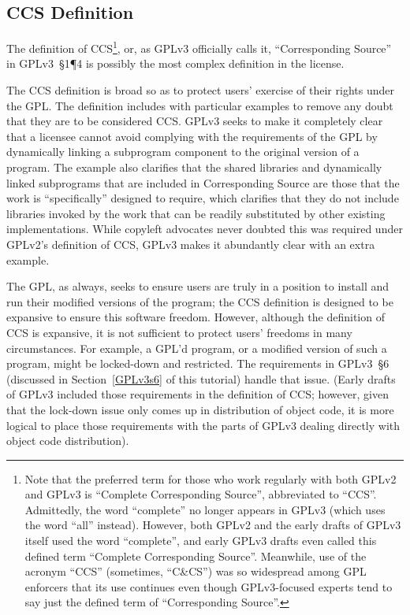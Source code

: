 \subsection{CCS Definition}
\label{CCS Definition}

The definition of CCS\footnote{Note that the preferred term for those who
  work regularly with both GPLv2 and GPLv3 is ``Complete Corresponding
  Source'', abbreviated to ``CCS''.  Admittedly, the word ``complete'' no
  longer appears in GPLv3 (which uses the word ``all'' instead).  However,
  both GPLv2 and the early drafts of GPLv3 itself used the word ``complete'',
  and early GPLv3 drafts even called this defined term ``Complete
  Corresponding Source''.  Meanwhile, use of the acronym ``CCS'' (sometimes,
  ``C\&CS'') was so widespread among GPL enforcers that its use continues
  even though GPLv3-focused experts tend to say just the defined term of
  ``Corresponding Source''.}, or, as GPLv3 officially calls it,
``Corresponding Source'' in GPLv3~\S1\P4 is possibly the most complex
definition in the license.

The CCS definition is broad so as to protect users' exercise of their rights
under the GPL\@.  The definition includes with particular examples to remove
any doubt that they are to be considered CCS\@.  GPLv3 seeks to make it
completely clear that a licensee cannot avoid complying with the requirements
of the GPL by dynamically linking a subprogram component to the original
version of a program.  The example also clarifies that the shared libraries
and dynamically linked subprograms that are included in Corresponding Source
are those that the work is ``specifically'' designed to require, which
clarifies that they do not include libraries invoked by the work that can be
readily substituted by other existing implementations.  While copyleft
advocates never doubted this was required under GPLv2's definition of CCS,
GPLv3 makes it abundantly clear with an extra example.

The GPL, as always, seeks to ensure users are truly in a position to install and
run their modified versions of the program; the CCS definition is designed to
be expansive to ensure this software freedom.  However, although the
definition of CCS is expansive, it is not sufficient to protect users'
freedoms in many circumstances.  For example, a GPL'd program, or a modified
version of such a program, might be locked-down and restricted.  The
requirements in GPLv3~\S6 (discussed in Section~\ref{GPLv3s6} of this
tutorial) handle that issue.  (Early drafts of GPLv3 included those
requirements in the definition of CCS; however, given that the lock-down
issue only comes up in distribution of object code, it is more logical to
place those requirements with the parts of GPLv3 dealing directly with object
code distribution).

